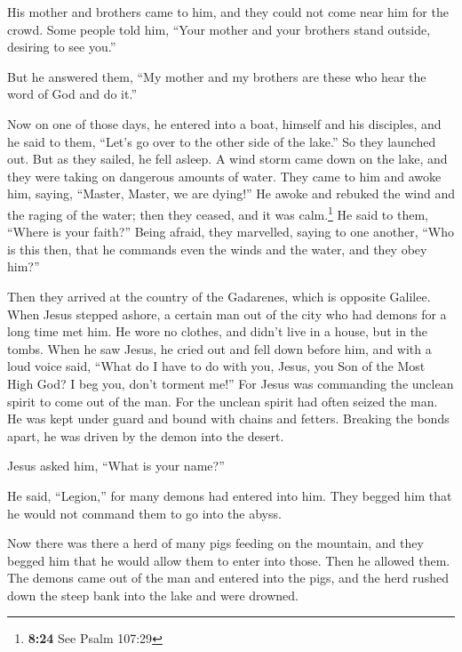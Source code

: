  His mother and brothers came to him, and they could not
come near him for the crowd.  Some people told him,
``Your mother and your brothers stand outside, desiring to see you.''

 But he answered them, ``My mother and my brothers are
these who hear the word of God and do it.''

 Now on one of those days, he entered into a boat,
himself and his disciples, and he said to them, ``Let's go over to the
other side of the lake.'' So they launched out.  But as
they sailed, he fell asleep. A wind storm came down on the lake, and
they were taking on dangerous amounts of water.  They
came to him and awoke him, saying, ``Master, Master, we are dying!'' He
awoke and rebuked the wind and the raging of the water; then they
ceased, and it was calm.\footnote{\textbf{8:24} See Psalm 107:29}
 He said to them, ``Where is your faith?'' Being afraid,
they marvelled, saying to one another, ``Who is this then, that he
commands even the winds and the water, and they obey him?''

 Then they arrived at the country of the Gadarenes, which
is opposite Galilee.  When Jesus stepped ashore, a
certain man out of the city who had demons for a long time met him. He
wore no clothes, and didn't live in a house, but in the tombs.
 When he saw Jesus, he cried out and fell down before
him, and with a loud voice said, ``What do I have to do with you, Jesus,
you Son of the Most High God? I beg you, don't torment me!''
 For Jesus was commanding the unclean spirit to come out
of the man. For the unclean spirit had often seized the man. He was kept
under guard and bound with chains and fetters. Breaking the bonds apart,
he was driven by the demon into the desert.

 Jesus asked him, ``What is your name?''

He said, ``Legion,'' for many demons had entered into him.
 They begged him that he would not command them to go
into the abyss.

 Now there was there a herd of many pigs feeding on the
mountain, and they begged him that he would allow them to enter into
those. Then he allowed them.  The demons came out of the
man and entered into the pigs, and the herd rushed down the steep bank
into the lake and were drowned.

